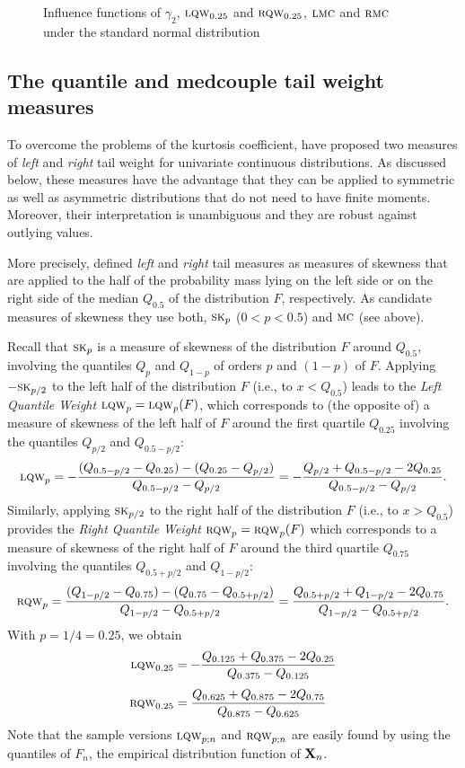 \begin{figure}[h!]
    \centering
    \caption{Influence functions of $\gamma_2$, $\stsc{LQW}_{0.25}$ and $\stsc{RQW}_{0.25}$, $\stsc{LMC}$ and $\stsc{RMC}$ under the standard normal distribution}
    \label{fig:stat:IF_tail}
\end{figure}

\subsection{The quantile and medcouple tail weight measures}

To overcome the problems of the kurtosis coefficient, \citet{brys:etal:2006}
have proposed two measures of \emph{left} and \emph{right} tail weight for
univariate continuous distributions. As discussed below, these measures have
the advantage that they can be applied to symmetric as well as asymmetric
distributions that do not need to have finite moments. Moreover, their
interpretation is unambiguous and they are robust against outlying values.

More precisely, \citet{brys:etal:2006} defined \emph{left} and \emph{right}
tail measures as measures of skewness that are applied to the half of the
probability mass lying on the left side or on the right side of the median
$Q_{0.5}$ of the distribution $F$, respectively. As candidate measures of skewness 
they use both, $\stsc{SK}_p$ ($0<p<0.5$) and $\stsc{MC}$ (see above).

Recall that $\stsc{SK}_p$ is a measure of skewness of the distribution $F$
around $Q_{0.5}$, involving the quantiles $Q_p$ and $Q_{1-p}$ of orders $p$
and $(1-p)$ of $F$. Applying $-\stsc{SK}_{p/2}$ to the left half of the
distribution $F$ (i.e., to $x<Q_{0.5}$) leads to the \emph{Left Quantile
Weight} $\stsc{LQW}_p = \stsc{LQW}_p(F)$, which corresponds to (the
opposite of) a measure of skewness of the left half of $F$ around the first
quartile $Q_{0.25}$ involving the quantiles $Q_{p/2}$ and $Q_{0.5-p/2}$:
\[
    \stsc{LQW}_p 
    = -\frac{(Q_{0.5-p/2} - Q_{0.25}) - (Q_{0.25} - Q_{p/2})}{Q_{0.5-p/2}-Q_{p/2}}
    = -\frac{Q_{p/2}  +Q_{0.5-p/2} - 2 Q_{0.25}}{Q_{0.5-p/2} - Q_{p/2}}.
\]
Similarly, applying $\stsc{SK}_{p/2}$ to the right half of the distribution
$F$ (i.e., to $x>Q_{0.5}$) provides the \emph{Right Quantile Weight}
$\stsc{RQW}_p = \stsc{RQW}_p(F)$ which corresponds to a measure of
skewness of the right half of $F$ around the third quartile $Q_{0.75}$
involving the quantiles $Q_{0.5+p/2}$ and $Q_{1-p/2}$:
\[
    \stsc{RQW}_p
    = \frac{(Q_{1-p/2} - Q_{0.75}) - (Q_{0.75} - Q_{0.5+p/2})}{Q_{1-p/2} - Q_{0.5+p/2}}
    = \frac{Q_{0.5+p/2} + Q_{1-p/2} - 2 Q_{0.75}}{Q_{1-p/2} - Q_{0.5+p/2}}.
\]
With $p = 1/4 = 0.25$, we obtain
%
\begin{align*}
    \stsc{LQW}_{0.25} & = -\frac{Q_{0.125} + Q_{0.375} - 2 Q_{0.25}}{Q_{0.375} - Q_{0.125}}\\[1ex]
    \stsc{RQW}_{0.25} & =  \frac{Q_{0.625} + Q_{0.875} - 2 Q_{0.75}}{Q_{0.875} - Q_{0.625}}
\end{align*}
%
Note that the sample versions $\stsc{LQW}_{p;n}$ and $\stsc{RQW}_{p;n}$
are easily found by using the quantiles of $F_n$, the empirical distribution
function of $\mathbf X_n$.

